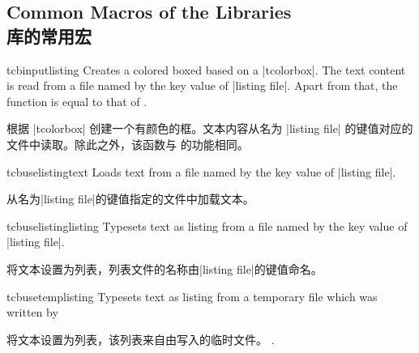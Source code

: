 \subsection{Common Macros of the Libraries\\库的常用宏}
% 
 





\begin{docCommand}{tcbinputlisting}{}
Creates a colored boxed based on a |tcolorbox|. The text content is read
from a file named by the key value of |listing file|. Apart from that,
the function is equal to that of .

根据 |tcolorbox| 创建一个有颜色的框。文本内容从名为 |listing file| 的键值对应的文件中读取。除此之外，该函数与  的功能相同。
\begin{dispExample}
\end{dispExample}
\end{docCommand}

\begin{docCommand}{tcbuselistingtext}{}
Loads text from a file named by the key value of |listing file|.

从名为|listing file|的键值指定的文件中加载文本。
\begin{dispExample}
\tcbuselistingtext
\end{dispExample}
\end{docCommand}


\begin{docCommand}{tcbuselistinglisting}{}
Typesets text as listing from a file named by the key value of |listing file|.

将文本设置为列表，列表文件的名称由|listing file|的键值命名。
\begin{dispExample}
\tcbuselistinglisting
\end{dispExample}
\end{docCommand}

\begin{docCommand}{tcbusetemplisting}{}
Typesets text as listing from a temporary file which was written by

将文本设置为列表，该列表来自由写入的临时文件。
.
\end{docCommand}


